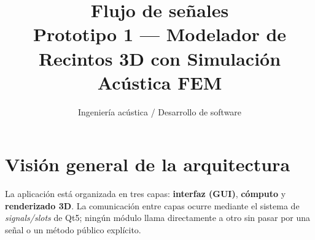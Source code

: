 \documentclass[11pt,a4paper]{article}
\begin{document}

\title{\textbf{Flujo de señales}\\
       Prototipo 1 — Modelador de Recintos 3D con Simulación Acústica FEM}
\author{Ingeniería acústica / Desarrollo de software}
\date{}
\maketitle
\tableofcontents
\newpage

\section{Visión general de la arquitectura}

La aplicación está organizada en tres capas: \textbf{interfaz (GUI)},
\textbf{cómputo} y \textbf{renderizado 3D}.  La comunicación entre capas
ocurre mediante el sistema de \emph{signals/slots} de Qt5; ningún módulo
llama directamente a otro sin pasar por una señal o un método público
explícito.
\end{document}
